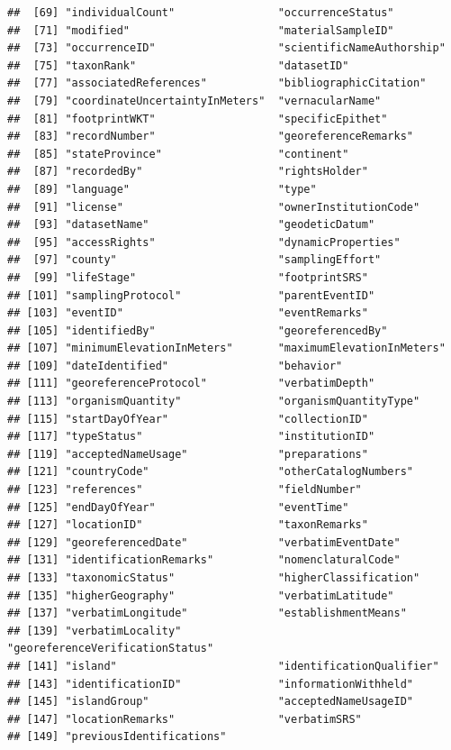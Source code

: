 \documentclass[
]{book}
\begin{document}
\begin{verbatim}
##  [69] "individualCount"                "occurrenceStatus"              
##  [71] "modified"                       "materialSampleID"              
##  [73] "occurrenceID"                   "scientificNameAuthorship"      
##  [75] "taxonRank"                      "datasetID"                     
##  [77] "associatedReferences"           "bibliographicCitation"         
##  [79] "coordinateUncertaintyInMeters"  "vernacularName"                
##  [81] "footprintWKT"                   "specificEpithet"               
##  [83] "recordNumber"                   "georeferenceRemarks"           
##  [85] "stateProvince"                  "continent"                     
##  [87] "recordedBy"                     "rightsHolder"                  
##  [89] "language"                       "type"                          
##  [91] "license"                        "ownerInstitutionCode"          
##  [93] "datasetName"                    "geodeticDatum"                 
##  [95] "accessRights"                   "dynamicProperties"             
##  [97] "county"                         "samplingEffort"                
##  [99] "lifeStage"                      "footprintSRS"                  
## [101] "samplingProtocol"               "parentEventID"                 
## [103] "eventID"                        "eventRemarks"                  
## [105] "identifiedBy"                   "georeferencedBy"               
## [107] "minimumElevationInMeters"       "maximumElevationInMeters"      
## [109] "dateIdentified"                 "behavior"                      
## [111] "georeferenceProtocol"           "verbatimDepth"                 
## [113] "organismQuantity"               "organismQuantityType"          
## [115] "startDayOfYear"                 "collectionID"                  
## [117] "typeStatus"                     "institutionID"                 
## [119] "acceptedNameUsage"              "preparations"                  
## [121] "countryCode"                    "otherCatalogNumbers"           
## [123] "references"                     "fieldNumber"                   
## [125] "endDayOfYear"                   "eventTime"                     
## [127] "locationID"                     "taxonRemarks"                  
## [129] "georeferencedDate"              "verbatimEventDate"             
## [131] "identificationRemarks"          "nomenclaturalCode"             
## [133] "taxonomicStatus"                "higherClassification"          
## [135] "higherGeography"                "verbatimLatitude"              
## [137] "verbatimLongitude"              "establishmentMeans"            
## [139] "verbatimLocality"               "georeferenceVerificationStatus"
## [141] "island"                         "identificationQualifier"       
## [143] "identificationID"               "informationWithheld"           
## [145] "islandGroup"                    "acceptedNameUsageID"           
## [147] "locationRemarks"                "verbatimSRS"                   
## [149] "previousIdentifications"
\end{verbatim}
\end{document}
